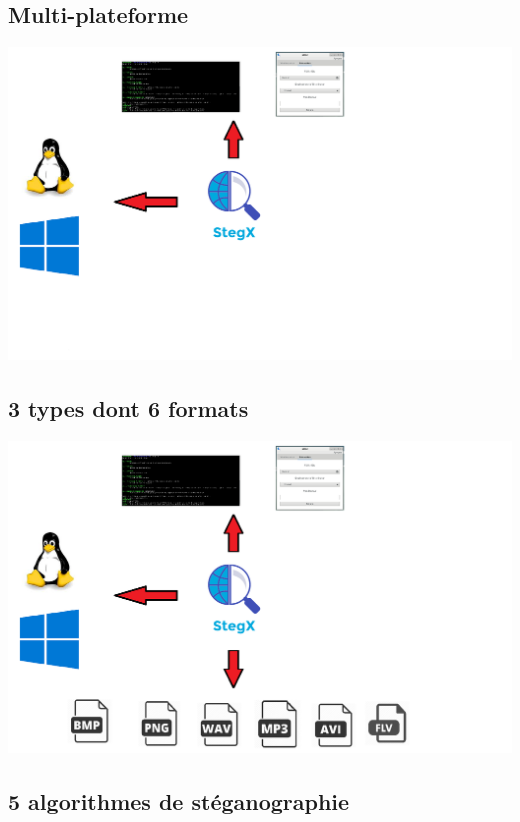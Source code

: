 \documentclass{beamer}
\begin{document}
  \subsection{Multi-plateforme}
  
  \begin{frame}
  \includegraphics[scale=0.3]{pictures/bilan_2}
  \end{frame}
  
  \subsection{3 types dont 6 formats}
  
  \begin{frame}
  \includegraphics[scale=0.3]{pictures/bilan_3}
  \end{frame}
  
  \subsection{5 algorithmes de stéganographie}
  
\end{document}

